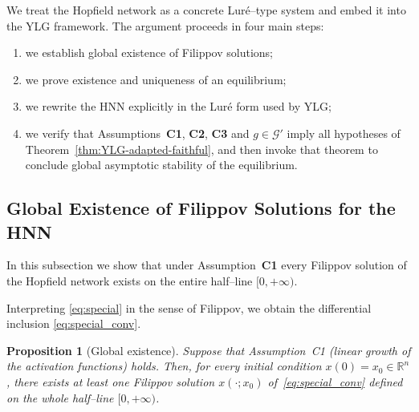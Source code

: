 \documentclass[journal]{IEEEtran}
\theoremstyle{myplain}
\newtheorem{proposition}{Proposition}
\begin{document}
We treat the Hopfield network as a concrete Lur\'e–type system and
embed it into the YLG framework.  The argument proceeds in four main
steps:
\begin{enumerate}

  \item we establish global existence of Filippov solutions;
  \item we prove existence and uniqueness of an equilibrium;
  \item we rewrite the HNN explicitly in the Lur\'e form used by YLG;
  \item we verify that Assumptions~\textbf{C1}, \textbf{C2},
        \textbf{C3} and $g\in\mathcal G'$ imply all hypotheses of
        Theorem~\ref{thm:YLG-adapted-faithful}, and then invoke that theorem
        to conclude global asymptotic stability of the equilibrium.
\end{enumerate}

\subsection{Global Existence of Filippov Solutions for the HNN}

In this subsection we show that under Assumption~\textbf{C1} every
Filippov solution of the Hopfield network exists on the entire
half–line $[0,+\infty)$.

Interpreting \eqref{eq:special} in the sense of Filippov, we obtain
the differential inclusion \eqref{eq:special_conv}.

\begin{proposition}[Global existence]
\label{prop:global-existence}
Suppose that Assumption~C1 (linear growth of the activation functions)
holds. Then, for every initial condition $x(0)=x_0\in\mathbb{R}^n$,
there exists at least one Filippov solution $x(\cdot;x_0)$
of~\eqref{eq:special_conv} defined on the whole half–line $[0,+\infty)$.
\end{proposition}
\end{document}
